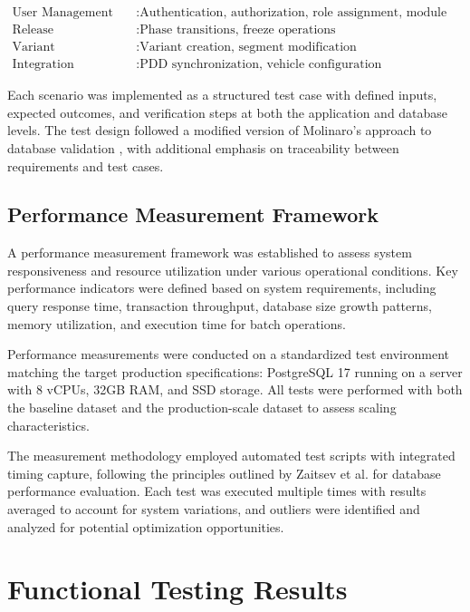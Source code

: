 \begin{align*}
\text{User Management} &: \text{Authentication, authorization, role assignment, module access} \\
\text{Release Management} &: \text{Phase transitions, freeze operations} \\
\text{Variant Management} &: \text{Variant creation, segment modification} \\
\text{Integration} &: \text{PDD synchronization, vehicle configuration}
\end{align*}

Each scenario was implemented as a structured test case with defined inputs, expected outcomes, and verification steps at both the application and database levels. The test design followed a modified version of Molinaro's approach to database validation \cite{molinaro2005sql}, with additional emphasis on traceability between requirements and test cases.

\subsection{Performance Measurement Framework}
\label{subsec:performance-measurement-framework}

A performance measurement framework was established to assess system responsiveness and resource utilization under various operational conditions. Key performance indicators were defined based on system requirements, including query response time, transaction throughput, database size growth patterns, memory utilization, and execution time for batch operations. 

Performance measurements were conducted on a standardized test environment matching the target production specifications: PostgreSQL 17 running on a server with 8 vCPUs, 32GB RAM, and SSD storage. All tests were performed with both the baseline dataset and the production-scale dataset to assess scaling characteristics.

The measurement methodology employed automated test scripts with integrated timing capture, following the principles outlined by Zaitsev et al. \cite{schwartz2012high} for database performance evaluation. Each test was executed multiple times with results averaged to account for system variations, and outliers were identified and analyzed for potential optimization opportunities.

\section{Functional Testing Results}
\label{sec:functional-testing-results}

